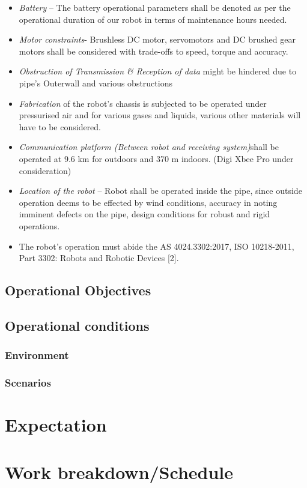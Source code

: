 \documentclass[a4paper,table]{article}
\begin{document}
\begin{itemize}
    \item{\textit{Battery} – The battery operational parameters shall be denoted as per the operational duration of our robot in terms of maintenance hours needed.}
    \item{\textit{Motor constraints}- Brushless DC motor, servomotors and DC brushed gear motors shall be considered with trade-offs to speed, torque and accuracy.}
    \item{\textit{Obstruction of Transmission \& Reception of data} might be hindered due to pipe’s Outerwall and various obstructions}
    \item{\textit{Fabrication} of the robot’s chassis is subjected to be operated under pressurised air and for various gases and liquids, various other materials will have to be considered.}
    \item{\textit{Communication platform (Between robot and receiving system)}shall be operated at 9.6 km for outdoors and 370 m indoors. (Digi Xbee Pro under consideration)}
    \item{\textit{Location of the robot} – Robot shall be operated inside the pipe, since outside operation deems to be effected by wind conditions, accuracy in noting imminent defects on the pipe, design conditions for robust and rigid operations.}
    \item{The robot’s operation must abide the AS 4024.3302:2017, ISO 10218-2011, Part 3302: Robots and Robotic Devices [2].}
\end{itemize}
\subsection{Operational Objectives}
\subsection{Operational conditions}
\subsubsection{Environment}
\subsubsection{Scenarios}
\section{Expectation}

\section{Work breakdown/Schedule}
\end{document}
